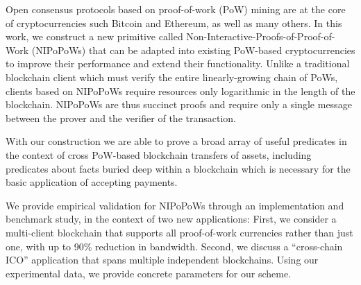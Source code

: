 Open consensus protocols based on proof-of-work (PoW) mining are at the core of
cryptocurrencies such Bitcoin and Ethereum, as well as many others. In this
work, we construct a new primitive called
Non-Interactive-Proofs-of-Proof-of-Work (NIPoPoWs) that can be adapted into
existing PoW-based cryptocurrencies to improve their performance and extend
their functionality. Unlike a traditional blockchain client which must verify
the entire linearly-growing chain of PoWs, clients based on NIPoPoWs require
resources only logarithmic in the length of the blockchain. NIPoPoWs are thus
succinct proofs and require only a single message between the prover and the
verifier of the transaction.

With our construction we are able to prove a broad array of useful predicates in
the context of cross PoW-based blockchain transfers of assets,  including
predicates about facts buried deep within a blockchain which is necessary for
the basic application of accepting payments.

We provide empirical validation for NIPoPoWs through an implementation and
benchmark study, in the context of two new applications: First, we consider a
multi-client blockchain that supports all proof-of-work currencies rather than
just one, with up to 90\% reduction in bandwidth.  Second, we discuss a
``cross-chain ICO'' application that spans multiple independent blockchains.
Using our experimental data, we provide concrete parameters for our scheme.
